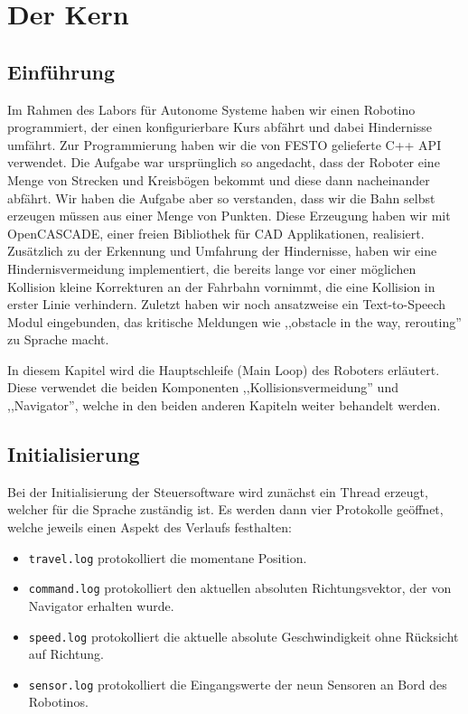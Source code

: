 \chapter{Der Kern}

\section{Einführung}

Im Rahmen des Labors für Autonome Systeme haben wir einen Robotino \cite{festo}
programmiert, der einen konfigurierbare Kurs abfährt und dabei Hindernisse
umfährt. Zur Programmierung haben wir die von FESTO gelieferte C++ API
verwendet. Die Aufgabe war ursprünglich so angedacht, dass der Roboter eine
Menge von Strecken und Kreisbögen bekommt und diese dann nacheinander abfährt.
Wir haben die Aufgabe aber so verstanden, dass wir die Bahn selbst erzeugen
müssen aus einer Menge von Punkten. Diese Erzeugung haben wir mit OpenCASCADE,
einer freien Bibliothek für CAD Applikationen, realisiert. Zusätzlich zu der
Erkennung und Umfahrung der Hindernisse, haben wir eine Hindernisvermeidung
implementiert, die bereits lange vor einer möglichen Kollision kleine
Korrekturen an der Fahrbahn vornimmt, die eine Kollision in erster Linie
verhindern. Zuletzt haben wir noch ansatzweise ein Text-to-Speech Modul
eingebunden, das kritische Meldungen wie ,,obstacle in the way, rerouting'' zu
Sprache macht.

In diesem Kapitel wird die Hauptschleife (Main Loop) des Roboters erläutert.
Diese verwendet die beiden Komponenten ,,Kollisionsvermeidung'' und
,,Navigator'', welche in den beiden anderen Kapiteln weiter behandelt werden.


\section{Initialisierung}

Bei der Initialisierung der Steuersoftware wird zunächst ein Thread erzeugt,
welcher für die Sprache zuständig ist. Es werden dann vier Protokolle geöffnet,
welche jeweils einen Aspekt des Verlaufs festhalten:

\begin{itemize}
	\item \verb|travel.log|
		protokolliert die momentane Position.
	\item \verb|command.log|
		protokolliert den aktuellen absoluten Richtungsvektor, der von Navigator
		erhalten wurde.
	\item \verb|speed.log|
		protokolliert die aktuelle absolute Geschwindigkeit ohne Rücksicht auf
		Richtung.
	\item \verb|sensor.log|
		protokolliert die Eingangswerte der neun Sensoren an Bord des Robotinos.
\end{itemize}

